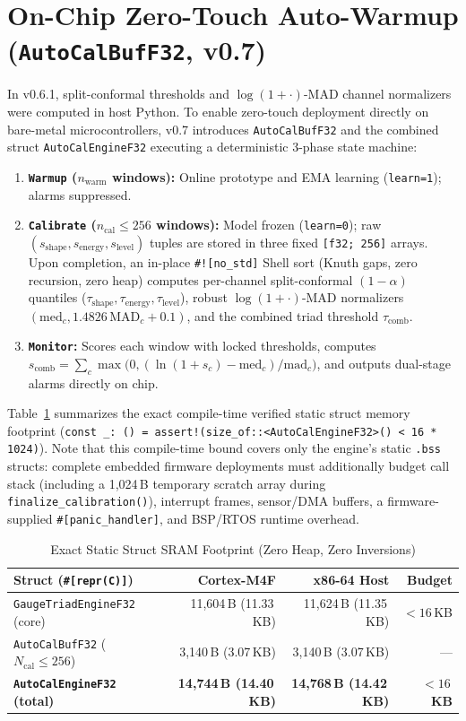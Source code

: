 \documentclass[conference]{IEEEtran}
\begin{document}
\section{On-Chip Zero-Touch Auto-Warmup (\texttt{AutoCalBufF32}, v0.7)}
In v0.6.1, split-conformal thresholds and $\log(1+\cdot)$-MAD channel normalizers were computed in host Python. To enable zero-touch deployment directly on bare-metal microcontrollers, v0.7 introduces \texttt{AutoCalBufF32} and the combined struct \texttt{AutoCalEngineF32} executing a deterministic 3-phase state machine:
\begin{enumerate}
  \item \textbf{\texttt{Warmup} ($n_{\text{warm}}$ windows):} Online prototype and EMA learning (\texttt{learn=1}); alarms suppressed.
  \item \textbf{\texttt{Calibrate} ($n_{\text{cal}} \le 256$ windows):} Model frozen (\texttt{learn=0}); raw $(s_{\text{shape}}, s_{\text{energy}}, s_{\text{level}})$ tuples are stored in three fixed \texttt{[f32; 256]} arrays. Upon completion, an in-place \texttt{\#![no\_std]} Shell sort (Knuth gaps, zero recursion, zero heap) computes per-channel split-conformal $(1-\alpha)$ quantiles ($\tau_{\text{shape}}, \tau_{\text{energy}}, \tau_{\text{level}}$), robust $\log(1+\cdot)$-MAD normalizers $(\text{med}_c, 1.4826\,\text{MAD}_c + 0.1)$, and the combined triad threshold $\tau_{\text{comb}}$.
  \item \textbf{\texttt{Monitor}:} Scores each window with locked thresholds, computes $s_{\text{comb}} = \sum_{c} \max\bigl(0, (\ln(1+s_c)-\text{med}_c)/\text{mad}_c\bigr)$, and outputs dual-stage alarms directly on chip.
\end{enumerate}

Table~\ref{tab:sram} summarizes the exact compile-time verified static struct memory footprint (\texttt{const \_: () = assert!(size\_of::<AutoCalEngineF32>() < 16 * 1024)}). Note that this compile-time bound covers only the engine's static \texttt{.bss} structs: complete embedded firmware deployments must additionally budget call stack (including a 1,024\,B temporary scratch array during \texttt{finalize\_calibration()}), interrupt frames, sensor/DMA buffers, a firmware-supplied \texttt{\#[panic\_handler]}, and BSP/RTOS runtime overhead.

\begin{table}[t]
\centering
\caption{Exact Static Struct SRAM Footprint (Zero Heap, Zero Inversions)}
\label{tab:sram}
\begin{tabular}{@{}lrrr@{}}
\toprule
\textbf{Struct (\texttt{\#[repr(C)]})} & \textbf{Cortex-M4F} & \textbf{x86-64 Host} & \textbf{Budget} \\
\midrule
\texttt{GaugeTriadEngineF32} (core) & 11,604\,B (11.33\,KB) & 11,624\,B (11.35\,KB) & $<16$\,KB \\
\texttt{AutoCalBufF32} ($N_{\text{cal}}\!\le\!256$) & 3,140\,B (3.07\,KB) & 3,140\,B (3.07\,KB) & --- \\
\textbf{\texttt{AutoCalEngineF32} (total)} & \textbf{14,744\,B (14.40\,KB)} & \textbf{14,768\,B (14.42\,KB)} & \textbf{$<16$\,KB} \\
\bottomrule
\end{tabular}
\end{table}
\end{document}

